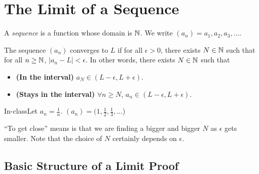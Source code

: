 \section{The Limit of a Sequence}

\begin{definition}
    A \textit{sequence} is a function whose domain is $\mathbb{N}$. We write $(a_n) = a_1,a_2,a_3,\dots$.
\end{definition}
\setcounter{BoxCounter}{2}
\begin{definition}
    The sequence $(a_n)$ converges to $L$ if for all $\epsilon > 0$, there exists $N \in \mathbb{N}$ such that for all $n \geq \mathbb{N}$, $|a_n - L| < \epsilon$. In other words, there exists $N \in \mathbb{N}$ such that
    \begin{itemize}
        \item \textbf{(In the interval)} $a_N \in (L - \epsilon, L + \epsilon)$.
        \item \textbf{(Stays in the interval)} $\forall n \geq N$, $a_n \in (L - \epsilon, L + \epsilon)$.
    \end{itemize}
\end{definition}

\begin{example}
    {In-class}Let $a_n = \frac{1}{n}$. $(a_n) = (1,\frac{1}{2},\frac{1}{3},\dots$)
\end{example}


``To get close'' means is that we are finding a bigger and bigger $N$ as $\epsilon$ gets smaller. Note that the choice of $N$ certainly depends on $\epsilon$.

\subsection{Basic Structure of a Limit Proof}

